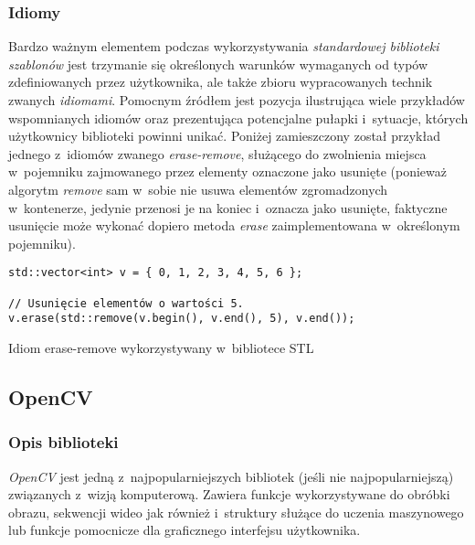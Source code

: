      \subsubsection{Idiomy}\label{Idioms}

        Bardzo ważnym elementem podczas wykorzystywania \textit{standardowej biblioteki szablonów} jest trzymanie się określonych warunków wymaganych od typów zdefiniowanych przez użytkownika, ale także zbioru wypracowanych technik zwanych \textit{idiomami}. Pomocnym źródłem jest pozycja \cite{EffectiveStl} ilustrująca wiele przykładów wspomnianych idiomów oraz prezentująca potencjalne pułapki i~sytuacje, których użytkownicy biblioteki powinni unikać. Poniżej zamieszczony został przykład jednego z~idiomów zwanego \textit{erase-remove}, służącego do zwolnienia miejsca w~pojemniku zajmowanego przez elementy oznaczone jako usunięte (ponieważ algorytm \textit{remove} sam w~sobie nie usuwa elementów zgromadzonych w~kontenerze, jedynie przenosi je na koniec i~oznacza jako usunięte, faktyczne usunięcie może wykonać dopiero metoda \textit{erase} zaimplementowana w~określonym pojemniku).

          \begin{sample}[ht]
            \begin{verbatim}
std::vector<int> v = { 0, 1, 2, 3, 4, 5, 6 };

// Usunięcie elementów o wartości 5.
v.erase(std::remove(v.begin(), v.end(), 5), v.end());
            \end{verbatim}
            \caption{Idiom erase-remove wykorzystywany w~bibliotece STL}
            \label{EraseRemoveIdiom}
          \end{sample}

    \subsection{OpenCV}\label{Subsection_OpenCV}

      \subsubsection{Opis biblioteki}

        \textit{OpenCV} jest jedną z~najpopularniejszych bibliotek (jeśli nie najpopularniejszą) związanych z~wizją komputerową. Zawiera funkcje wykorzystywane do obróbki obrazu, sekwencji wideo jak również i~struktury służące do uczenia maszynowego lub funkcje pomocnicze dla graficznego interfejsu użytkownika.

